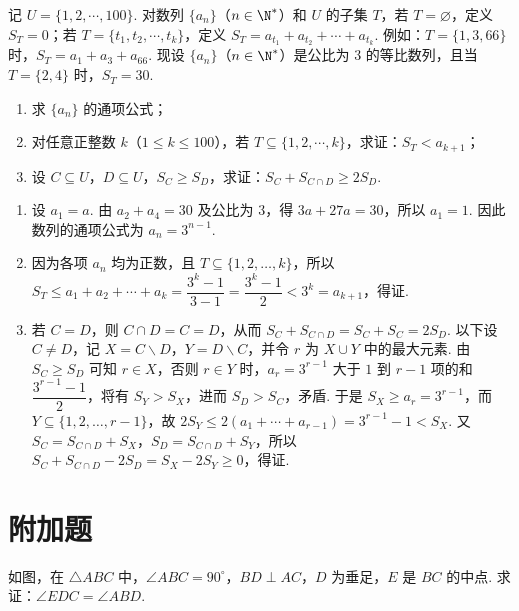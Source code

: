 \begin{problem}
记 \(U=\{1,2,\cdots,100\}\). 对数列 \(\{a_n\}\)（\(n\in\N^*\)）和 \(U\) 的子集 \(T\)，若 \(T=\varnothing\)，定义 \(S_T=0\)；若 \(T=\{t_1,t_2,\cdots,t_k\}\)，定义 \(S_T=a_{t_1}+a_{t_2}+\cdots+a_{t_k}\). 例如：\(T=\{1,3,66\}\) 时，\(S_T=a_1+a_3+a_{66}\). 现设 \(\{a_n\}\)（\(n\in\N^*\)）是公比为 \(3\) 的等比数列，且当 \(T=\{2,4\}\) 时，\(S_T=30\).

\begin{enumerate}
\item 求 \(\{a_n\}\) 的通项公式；
\item 对任意正整数 \(k\)（\(1\le k\le100\)），若 \(T\subseteq\{1,2,\cdots,k\}\)，求证：\(S_T<a_{k+1}\)；
\item 设 \(C\subseteq U\)，\(D\subseteq U\)，\(S_C\ge S_D\)，求证：\(S_C+S_{C\cap D}\ge2S_D\).
\end{enumerate}
\end{problem}

\begin{solution}
\begin{enumerate}
\item 设 \(a_1=a\). 由 \(a_2+a_4=30\) 及公比为 \(3\)，得 \(3a+27a=30\)，所以 \(a_1=1\). 因此数列的通项公式为 \(a_n=3^{n-1}\).
\item 因为各项 \(a_n\) 均为正数，且 \(T\subseteq\{1,2,\ldots,k\}\)，所以 \(S_T\le a_1+a_2+\cdots+a_k=\dfrac{3^k-1}{3-1}=\dfrac{3^k-1}{2}<3^k=a_{k+1}\)，得证.
\item 若 \(C=D\)，则 \(C\cap D=C=D\)，从而 \(S_C+S_{C\cap D}=S_C+S_C=2S_D\). 以下设 \(C\ne D\)，记 \(X=C\mathbin{\backslash}D\)，\(Y=D\mathbin{\backslash}C\)，并令 \(r\) 为 \(X\cup Y\) 中的最大元素. 由 \(S_C\ge S_D\) 可知 \(r\in X\)，否则 \(r\in Y\) 时，\(a_r=3^{r-1}\) 大于 \(1\) 到 \(r-1\) 项的和 \(\dfrac{3^{r-1}-1}{2}\)，将有 \(S_Y>S_X\)，进而 \(S_D>S_C\)，矛盾. 于是 \(S_X\ge a_r=3^{r-1}\)，而 \(Y\subseteq\{1,2,\ldots,r-1\}\)，故 \(2S_Y\le2(a_1+\cdots+a_{r-1})=3^{r-1}-1<S_X\). 又 \(S_C=S_{C\cap D}+S_X\)，\(S_D=S_{C\cap D}+S_Y\)，所以 \(S_C+S_{C\cap D}-2S_D=S_X-2S_Y\ge0\)，得证.
\end{enumerate}
\end{solution}

\section{附加题}

\begin{problem}[A]
如图，在 \(\triangle ABC\) 中，\(\angle ABC=90^\circ\)，\(BD\perp AC\)，\(D\) 为垂足，\(E\) 是 \(BC\) 的中点. 求证：\(\angle EDC=\angle ABD\).

\end{problem}

